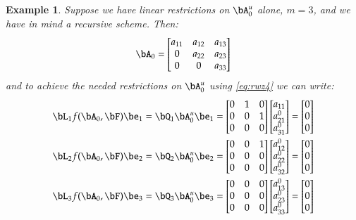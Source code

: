 \documentclass [12pt]{article}
\newtheorem{example}{Example}
\begin{document}
    \begin{example}{}
        Suppose we have linear restrictions on $\bA^u_0$ alone, $m=3$, and we have in mind a recursive scheme. Then:
        \begin{equation*}
            \bA_0 = \begin{bmatrix}
                      a_{11} & a_{12} & a_{13} \\
                      0 & a_{22} & a_{23} \\
                      0 & 0 & a_{33}
                    \end{bmatrix}
        \end{equation*}
        and to achieve the needed restrictions on $\bA^u_0$ using \eqref{eq:rwz4} we can write:
        \begin{align*}
           \bL_1 f( \bA_0, \bF ) \be_1 = \bQ_1 \bA^u_0 \be_1 &= \begin{bmatrix} 0 & 1 & 0 \\ 0 & 0 & 1 \\ 0 & 0 & 0 \end{bmatrix} \begin{bmatrix} a_{11} \\ a^0_{21} \\ a^0_{31} \end{bmatrix} = \begin{bmatrix} 0 \\ 0 \\ 0 \end{bmatrix} \\
           \bL_2 f( \bA_0, \bF ) \be_2 = \bQ_2 \bA^u_0 \be_2 &= \begin{bmatrix} 0 & 0 & 1 \\ 0 & 0 & 0 \\ 0 & 0 & 0 \end{bmatrix} \begin{bmatrix} a^0_{12} \\ a^0_{22} \\ a^0_{32} \end{bmatrix} = \begin{bmatrix} 0 \\ 0 \\ 0 \end{bmatrix} \\
           \bL_3 f( \bA_0, \bF ) \be_3 =  \bQ_3 \bA^u_0 \be_3 &= \begin{bmatrix} 0 & 0 & 0 \\ 0 & 0 & 0 \\ 0 & 0 & 0 \end{bmatrix} \begin{bmatrix} a^0_{13} \\ a^0_{23} \\ a^0_{33} \end{bmatrix} = \begin{bmatrix} 0 \\ 0 \\ 0 \end{bmatrix}

\end{align*}
\end{example}
\end{document}
